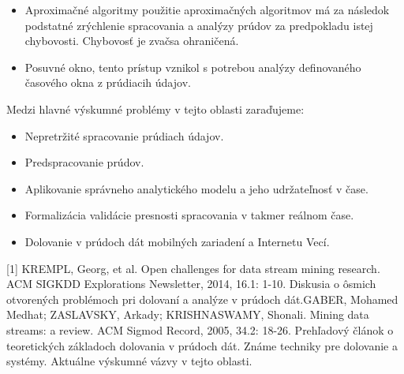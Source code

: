\documentclass[11pt]{article}
\begin{document}
\begin{itemize}
	\item Aproximačné algoritmy použitie aproximačných algoritmov má za následok podstatné zrýchlenie spracovania a analýzy prúdov za predpokladu istej chybovosti. Chybovosť je zvačsa ohraničená.
	\item Posuvné okno, tento prístup vznikol s potrebou analýzy definovaného časového okna z prúdiacih údajov.
\end{itemize}
Medzi hlavné výskumné problémy v tejto oblasti zaraďujeme:
\begin{itemize}
	\item Nepretržité spracovanie prúdiach údajov.
	\item Predspracovanie prúdov.
	\item Aplikovanie správneho analytického modelu a jeho udržateľnosť v čase.
	\item Formalizácia validácie presnosti spracovania v takmer reálnom čase.
	\item Dolovanie v prúdoch dát mobilných zariadení a Internetu Vecí.
\end{itemize}
[1] KREMPL, Georg, et al. Open challenges for data stream mining research. ACM SIGKDD Explorations Newsletter, 2014, 16.1: 1-10. \newline
Diskusia o ôsmich otvorených problémoch pri dolovaní a analýze v prúdoch dát.\newline
[2] GABER, Mohamed Medhat; ZASLAVSKY, Arkady; KRISHNASWAMY, Shonali. Mining data streams: a review. ACM Sigmod Record, 2005, 34.2: 18-26. \newline
	Prehľadový článok o teoretických základoch dolovania v prúdoch dát. Známe techniky pre dolovanie a systémy. Aktuálne výskumné vázvy v tejto oblasti.
\end{document}
